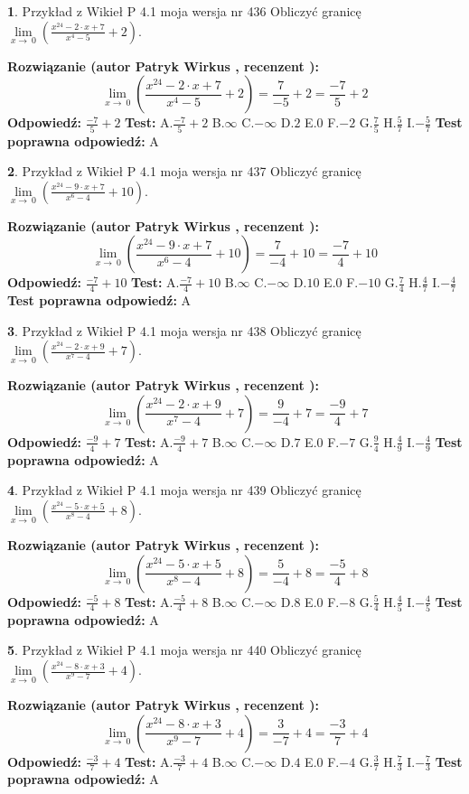 \documentclass[12pt, a4paper]{article}
\theoremstyle{definition} %
\newtheorem{zad}{}
\newcommand{\zadStart}[1]{\begin{zad}#1\newline}
\newcommand{\zadStop}{\end{zad}}
\newcommand{\rozwStart}[2]{\noindent \textbf{Rozwiązanie (autor #1 , recenzent #2): }\newline}
\newcommand{\rozwStop}{\newline}
\newcommand{\odpStart}{\noindent \textbf{Odpowiedź:}\newline}
\newcommand{\odpStop}{\newline}
\newcommand{\testStart}{\noindent \textbf{Test:}\newline}
\newcommand{\testStop}{\newline}
\newcommand{\kluczStart}{\noindent \textbf{Test poprawna odpowiedź:}\newline}
\newcommand{\kluczStop}{\newline}
\begin{document}
\zadStart{Przykład z Wikieł P 4.1 moja wersja nr 436}
Obliczyć granicę $\lim\limits_{x\to\ 0}(\frac{x^{24}-2 \cdot x +7}{x^{4}-5}+2)$.
\zadStop
\rozwStart{Patryk Wirkus}{}
$$\lim\limits_{x\to\ 0}(\frac{x^{24}-2 \cdot x +7}{x^{4}-5}+2)=\frac{7}{-5}+2=\frac{-7}{5}+2$$
\rozwStop
\odpStart
$\frac{-7}{5}+2$
\odpStop
\testStart
A.$\frac{-7}{5}+2$
B.$\infty$
C.$-\infty$
D.$2$
E.$0$
F.$-2$
G.$\frac{7}{5}$
H.$\frac{5}{7}$
I.$-\frac{5}{7}$
\testStop
\kluczStart
A
\kluczStop



\zadStart{Przykład z Wikieł P 4.1 moja wersja nr 437}
Obliczyć granicę $\lim\limits_{x\to\ 0}(\frac{x^{24}-9 \cdot x +7}{x^{6}-4}+10)$.
\zadStop
\rozwStart{Patryk Wirkus}{}
$$\lim\limits_{x\to\ 0}(\frac{x^{24}-9 \cdot x +7}{x^{6}-4}+10)=\frac{7}{-4}+10=\frac{-7}{4}+10$$
\rozwStop
\odpStart
$\frac{-7}{4}+10$
\odpStop
\testStart
A.$\frac{-7}{4}+10$
B.$\infty$
C.$-\infty$
D.$10$
E.$0$
F.$-10$
G.$\frac{7}{4}$
H.$\frac{4}{7}$
I.$-\frac{4}{7}$
\testStop
\kluczStart
A
\kluczStop



\zadStart{Przykład z Wikieł P 4.1 moja wersja nr 438}
Obliczyć granicę $\lim\limits_{x\to\ 0}(\frac{x^{24}-2 \cdot x +9}{x^{7}-4}+7)$.
\zadStop
\rozwStart{Patryk Wirkus}{}
$$\lim\limits_{x\to\ 0}(\frac{x^{24}-2 \cdot x +9}{x^{7}-4}+7)=\frac{9}{-4}+7=\frac{-9}{4}+7$$
\rozwStop
\odpStart
$\frac{-9}{4}+7$
\odpStop
\testStart
A.$\frac{-9}{4}+7$
B.$\infty$
C.$-\infty$
D.$7$
E.$0$
F.$-7$
G.$\frac{9}{4}$
H.$\frac{4}{9}$
I.$-\frac{4}{9}$
\testStop
\kluczStart
A
\kluczStop



\zadStart{Przykład z Wikieł P 4.1 moja wersja nr 439}
Obliczyć granicę $\lim\limits_{x\to\ 0}(\frac{x^{24}-5 \cdot x +5}{x^{8}-4}+8)$.
\zadStop
\rozwStart{Patryk Wirkus}{}
$$\lim\limits_{x\to\ 0}(\frac{x^{24}-5 \cdot x +5}{x^{8}-4}+8)=\frac{5}{-4}+8=\frac{-5}{4}+8$$
\rozwStop
\odpStart
$\frac{-5}{4}+8$
\odpStop
\testStart
A.$\frac{-5}{4}+8$
B.$\infty$
C.$-\infty$
D.$8$
E.$0$
F.$-8$
G.$\frac{5}{4}$
H.$\frac{4}{5}$
I.$-\frac{4}{5}$
\testStop
\kluczStart
A
\kluczStop



\zadStart{Przykład z Wikieł P 4.1 moja wersja nr 440}
Obliczyć granicę $\lim\limits_{x\to\ 0}(\frac{x^{24}-8 \cdot x +3}{x^{9}-7}+4)$.
\zadStop
\rozwStart{Patryk Wirkus}{}
$$\lim\limits_{x\to\ 0}(\frac{x^{24}-8 \cdot x +3}{x^{9}-7}+4)=\frac{3}{-7}+4=\frac{-3}{7}+4$$
\rozwStop
\odpStart
$\frac{-3}{7}+4$
\odpStop
\testStart
A.$\frac{-3}{7}+4$
B.$\infty$
C.$-\infty$
D.$4$
E.$0$
F.$-4$
G.$\frac{3}{7}$
H.$\frac{7}{3}$
I.$-\frac{7}{3}$
\testStop
\kluczStart
A
\kluczStop
\end{document}
